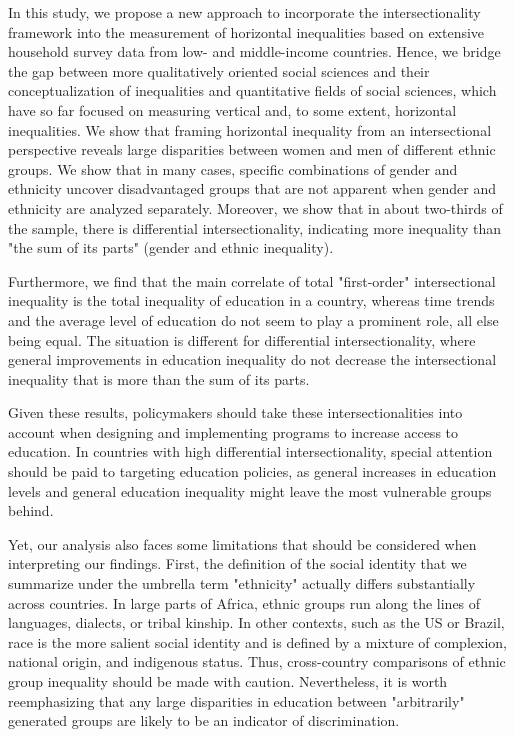 In this study, we propose a new approach to incorporate the intersectionality framework into the measurement of horizontal inequalities based on extensive household survey data from low- and middle-income countries. Hence, we bridge the gap between more qualitatively oriented social sciences and their conceptualization of inequalities and quantitative fields of social sciences, which have so far focused on measuring vertical and, to some extent, horizontal inequalities. We show that framing horizontal inequality from an intersectional perspective reveals large disparities between women and men of different ethnic groups. We show that in many cases, specific combinations of gender and ethnicity uncover disadvantaged groups that are not apparent when gender and ethnicity are analyzed separately. Moreover, we show that in about two-thirds of the sample, there is differential intersectionality, indicating more inequality than "the sum of its parts" (gender and ethnic inequality). 

Furthermore, we find that the main correlate of total "first-order" intersectional inequality is the total inequality of education in a country, whereas time trends and the average level of education do not seem to play a prominent role, all else being equal. The situation is different for differential intersectionality, where general improvements in education inequality do not decrease the intersectional inequality that is more than the sum of its parts. 
 
Given these results, policymakers should take these intersectionalities into account when designing and implementing programs to increase access to education. In countries with high differential intersectionality, special attention should be paid to targeting education policies, as general increases in education levels and general education inequality might leave the most vulnerable groups behind. 

Yet, our analysis also faces some limitations that should be considered when interpreting our findings. First, the definition of the social identity that we summarize under the umbrella term "ethnicity" actually differs substantially across countries. In large parts of Africa, ethnic groups run along the lines of languages, dialects, or tribal kinship. In other contexts, such as the US or Brazil, race is the more salient social identity and is defined by a mixture of complexion, national origin, and indigenous status. Thus, cross-country comparisons of ethnic group inequality should be made with caution. Nevertheless, it is worth reemphasizing that any large disparities in education between "arbitrarily" generated groups are likely to be an indicator of discrimination. 

